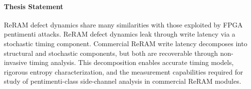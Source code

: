 \paragraph{Thesis Statement}
ReRAM defect dynamics share many similarities with those exploited by
FPGA pentimenti attacks. ReRAM defect dynamics leak through write
latency via a stochastic timing component. Commercial ReRAM write
latency decomposes into structural and stochastic components, but both
are recoverable through non-invasive timing analysis. This decomposition
enables accurate timing models, rigorous entropy characterization, and
the measurement capabilities required for study of pentimenti-class
side-channel analysis in commercial ReRAM modules.
